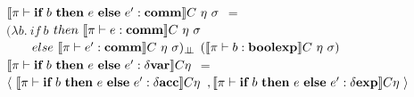 $\llbracket  \pi \vdash \textbf{if} \ b \ \textbf{then} \ e \ \textbf{else} \ e': \textbf{comm} \rrbracket C \ \eta \ \sigma$ 
$=$ \\
\indent \indent \indent 
$(\lambda b . \ if \ b $ $then \ \semBrcks{ \pi \vdash e : \commt}C \ \eta \ \sigma$\\
\indent \indent \indent \indent \indent \ \ \ \
$else \ \llbracket  \pi \vdash e' : \textbf{comm} \rrbracket C \ \eta \ \sigma)_{\bot \!\!\! \bot}$ 
$(\semBrcks{ \pi \vdash b : \boolexp}C \ \eta \ \sigma)$\\

$\llbracket  \pi \vdash \textbf{if} \ b \ \textbf{then} \ e \ \textbf{else} \ e': \delta \textbf{var} \rrbracket C\eta$ 
$=$ \\ 
\indent \indent
$\langle \ \llbracket  \pi \vdash \textbf{if} \ b \ \textbf{then} \ e \ \textbf{else} \ e': \delta \textbf{acc} \rrbracket C\eta$
$, \llbracket  \pi \vdash \textbf{if} \ b \ \textbf{then} \ e \ \textbf{else} \ e': \delta \textbf{exp} \rrbracket C\eta \ \rangle$ \\

